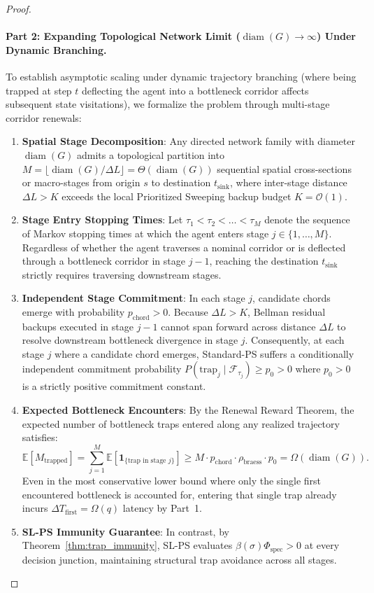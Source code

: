 \documentclass[11pt,a4paper]{article}
\begin{document}
\begin{proof}
\paragraph{Part 2: Expanding Topological Network Limit ($\operatorname{diam}(G) \to \infty$) Under Dynamic Branching.}
To establish asymptotic scaling under dynamic trajectory branching (where being trapped at step $t$ deflecting the agent into a bottleneck corridor affects subsequent state visitations), we formalize the problem through multi-stage corridor renewals:
\begin{enumerate}
    \item \textbf{Spatial Stage Decomposition}: Any directed network family with diameter $\operatorname{diam}(G)$ admits a topological partition into $M = \lfloor \operatorname{diam}(G) / \Delta L \rfloor = \Theta(\operatorname{diam}(G))$ sequential spatial cross-sections or macro-stages from origin $s$ to destination $t_{\text{sink}}$, where inter-stage distance $\Delta L > K$ exceeds the local Prioritized Sweeping backup budget $K = \mathcal{O}(1)$.
    \item \textbf{Stage Entry Stopping Times}: Let $\tau_1 < \tau_2 < \dots < \tau_M$ denote the sequence of Markov stopping times at which the agent enters stage $j \in \{1, \dots, M\}$. Regardless of whether the agent traverses a nominal corridor or is deflected through a bottleneck corridor in stage $j-1$, reaching the destination $t_{\text{sink}}$ strictly requires traversing downstream stages.
    \item \textbf{Independent Stage Commitment}: In each stage $j$, candidate chords emerge with probability $p_{\text{chord}} > 0$. Because $\Delta L > K$, Bellman residual backups executed in stage $j-1$ cannot span forward across distance $\Delta L$ to resolve downstream bottleneck divergence in stage $j$. Consequently, at each stage $j$ where a candidate chord emerges, Standard-PS suffers a conditionally independent commitment probability $P(\text{trap}_j \mid \mathcal{F}_{\tau_j}) \ge p_0 > 0$ where $p_0 > 0$ is a strictly positive commitment constant.
    \item \textbf{Expected Bottleneck Encounters}: By the Renewal Reward Theorem, the expected number of bottleneck traps entered along any realized trajectory satisfies:
    \begin{equation}
    \mathbb{E}[M_{\text{trapped}}] = \sum_{j=1}^M \mathbb{E}\left[ \mathbf{1}_{\{ \text{trap in stage } j \}} \right] \ge M \cdot p_{\text{chord}} \cdot \rho_{\text{braess}} \cdot p_0 = \Omega(\operatorname{diam}(G)).
    \end{equation}
    Even in the most conservative lower bound where only the single first encountered bottleneck is accounted for, entering that single trap already incurs $\Delta T_{\text{first}} = \Omega(q)$ latency by Part~1.
    \item \textbf{SL-PS Immunity Guarantee}: In contrast, by Theorem~\ref{thm:trap_immunity}, SL-PS evaluates $\beta(\sigma) \Phi_{\text{spec}} > 0$ at every decision junction, maintaining structural trap avoidance across all stages.
\end{enumerate}


\end{proof}
\end{document}
